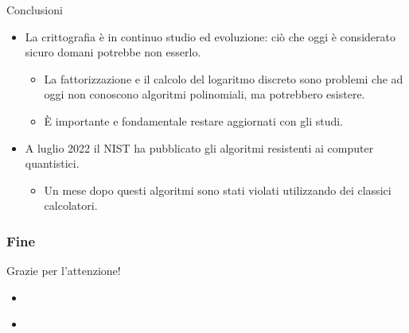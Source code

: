 \documentclass[11pt,svgnames,smaller,aspectratio=169,italian]{beamer}
\begin{document}
\begin{frame}{Conclusioni}
	\begin{itemize}
		\item La crittografia è in continuo studio ed evoluzione: ciò che oggi è considerato sicuro domani potrebbe non esserlo.
			\begin{itemize}
				\item La fattorizzazione e il calcolo del logaritmo discreto sono problemi che ad oggi non conoscono algoritmi polinomiali, ma potrebbero esistere.
				\item È importante e fondamentale restare aggiornati con gli studi.
			\end{itemize}
		\item A luglio 2022 il NIST ha pubblicato gli algoritmi resistenti ai computer quantistici.
			\begin{itemize}
				\item Un mese dopo questi algoritmi sono stati violati utilizzando dei classici calcolatori.
			\end{itemize}
	\end{itemize}
\end{frame}

\begin{frame}
		\frametitle{Fine}
		\centering
		\Large
		Grazie per l'attenzione!
 	\end{frame}

\begin{frame}{}
	\begin{itemize}
		\item 
	\end{itemize}
\end{frame}

\begin{frame}{}
	\begin{itemize}
		\item 
	\end{itemize}
\end{frame}














\end{document}
